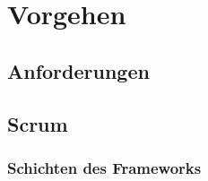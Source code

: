\chapter{Vorgehen}




\section{Anforderungen}



\section{Scrum}
\label{scrum}

\subsection{Schichten des Frameworks}


